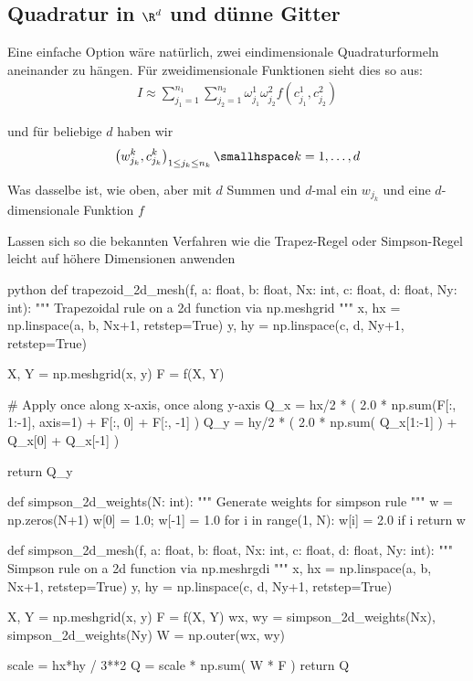 
\newsectionNoPB
\subsection{Quadratur in $\R^d$ und dünne Gitter}
Eine einfache Option wäre natürlich, zwei eindimensionale Quadraturformeln aneinander zu hängen.
Für zweidimensionale Funktionen sieht dies so aus:
\rmvspace
\begin{align*}
    I \approx \sum_{j_1=1}^{n_1}\sum_{j_2=1}^{n_2}
    \omega_{j_1}^{1} \omega_{j_2}^{2} f(c_{j_1}^{1}, c_{j_2}^{2})
\end{align*}

\drmvspace
und für beliebige $d$ haben wir
\rmvspace
\begin{align*}
    \left( w_{j_k}^k, c_{j_k}^k \right)_{1 \leq j_k \leq n_k} \smallhspace k = 1, \ldots, d
\end{align*}

\drmvspace
Was dasselbe ist, wie oben, aber mit $d$ Summen und $d$-mal ein $w_{j_k}$ und eine $d$-dimensionale Funktion $f$


\innumpy Lassen sich so die bekannten Verfahren wie die Trapez-Regel oder Simpson-Regel leicht auf höhere Dimensionen anwenden

\begin{code}{python}
def trapezoid_2d_mesh(f, a: float, b: float, Nx: int, c: float, d: float, Ny: int):
    """ Trapezoidal rule on a 2d function via np.meshgrid """
    x, hx = np.linspace(a, b, Nx+1, retstep=True)
    y, hy = np.linspace(c, d, Ny+1, retstep=True)
    
    X, Y = np.meshgrid(x, y)
    F = f(X, Y)
    
    # Apply once along x-axis, once along y-axis
    Q_x = hx/2 * ( 2.0 * np.sum(F[:, 1:-1], axis=1) + F[:, 0] + F[:, -1] )
    Q_y = hy/2 * ( 2.0 * np.sum( Q_x[1:-1] ) + Q_x[0] + Q_x[-1] )
    
    return Q_y

def simpson_2d_weights(N: int):
    """ Generate weights for simpson rule """
    w = np.zeros(N+1)
    w[0] = 1.0; w[-1] = 1.0
    for i in range(1, N): w[i] = 2.0 if i %
    return w

def simpson_2d_mesh(f, a: float, b: float, Nx: int, c: float, d: float, Ny: int):
    """ Simpson rule on a 2d function via np.meshrgdi """
    x, hx = np.linspace(a, b, Nx+1, retstep=True)
    y, hy = np.linspace(c, d, Ny+1, retstep=True)
    
    X, Y = np.meshgrid(x, y)
    F = f(X, Y)
    wx, wy = simpson_2d_weights(Nx), simpson_2d_weights(Ny)
    W = np.outer(wx, wy)
    
    scale = hx*hy / 3**2
    Q = scale * np.sum( W * F )
    return Q
\end{code}

